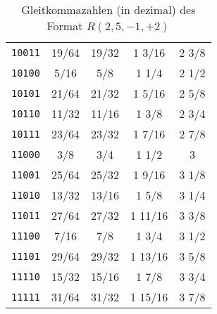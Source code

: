 \documentclass[11pt,a4paper]{article}
\begin{document}
\begin{table}[htbp]
\begin{tabular}{|c||cccc|}
    \texttt{10011} &   19/64  &   19/32  & 1   3/16  & 2   3/8   \\
    \texttt{10100} &    5/16  &    5/8   & 1   1/4   & 2   1/2   \\
    \texttt{10101} &   21/64  &   21/32  & 1   5/16  & 2   5/8   \\
    \texttt{10110} &   11/32  &   11/16  & 1   3/8   & 2   3/4   \\
    \texttt{10111} &   23/64  &   23/32  & 1   7/16  & 2   7/8   \\
    \texttt{11000} &    3/8   &    3/4   & 1   1/2   & 3         \\
    \texttt{11001} &   25/64  &   25/32  & 1   9/16  & 3   1/8   \\
    \texttt{11010} &   13/32  &   13/16  & 1   5/8   & 3   1/4   \\
    \texttt{11011} &   27/64  &   27/32  & 1  11/16  & 3   3/8   \\
    \texttt{11100} &    7/16  &    7/8   & 1   3/4   & 3   1/2   \\
    \texttt{11101} &   29/64  &   29/32  & 1  13/16  & 3   5/8   \\
    \texttt{11110} &   15/32  &   15/16  & 1   7/8   & 3   3/4   \\
 	\texttt{11111} &   31/64  &   31/32  & 1  15/16  & 3   7/8   \\
 \hline
    \end{tabular}%
  \caption{Gleitkommazahlen (in dezimal) des Format $R(2,5,-1,+2)$}
  \label{tab:gkz}%
\end{table}%












\end{document}
